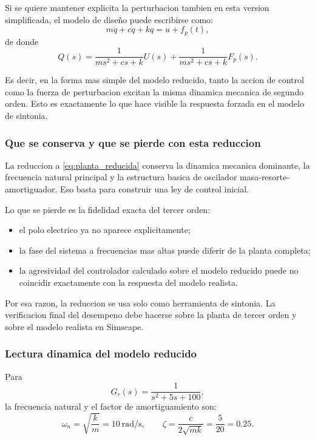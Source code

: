 \documentclass[11pt]{article}
\begin{document}
Si se quiere mantener explicita la perturbacion tambien en esta version simplificada, el modelo de dise\~no puede escribirse como:
\begin{equation}
m\ddot q + c\dot q + kq = u + f_p(t),
\label{eq:modelo_reducido_sintonia_forzado}
\end{equation}
de donde
\begin{equation}
Q(s)=\frac{1}{ms^2+cs+k}U(s)+\frac{1}{ms^2+cs+k}F_p(s).
\label{eq:gr_forzado}
\end{equation}

Es decir, en la forma mas simple del modelo reducido, tanto la accion de control como la fuerza de perturbacion excitan la misma dinamica mecanica de segundo orden. Esto es exactamente lo que hace visible la respuesta forzada en el modelo de sintonia.

\subsubsection{Que se conserva y que se pierde con esta reduccion}

La reduccion a \eqref{eq:planta_reducida} conserva la dinamica mecanica dominante, la frecuencia natural principal y la estructura basica de oscilador masa-resorte-amortiguador. Eso basta para construir una ley de control inicial.

Lo que se pierde es la fidelidad exacta del tercer orden:

\begin{itemize}[leftmargin=1.2cm]
\item el polo electrico ya no aparece explicitamente;
\item la fase del sistema a frecuencias mas altas puede diferir de la planta completa;
\item la agresividad del controlador calculado sobre el modelo reducido puede no coincidir exactamente con la respuesta del modelo realista.
\end{itemize}

Por esa razon, la reduccion se usa solo como herramienta de sintonia. La verificacion final del desempeno debe hacerse sobre la planta de tercer orden y sobre el modelo realista en Simscape.

\subsubsection{Lectura dinamica del modelo reducido}

Para
\[
G_r(s)=\frac{1}{s^2+5s+100},
\]
la frecuencia natural y el factor de amortiguamiento son:
\begin{equation}
\omega_n=\sqrt{\frac{k}{m}}=10\ \text{rad/s},
\qquad
\zeta=\frac{c}{2\sqrt{mk}}=\frac{5}{20}=0.25.
\end{equation}
\end{document}
